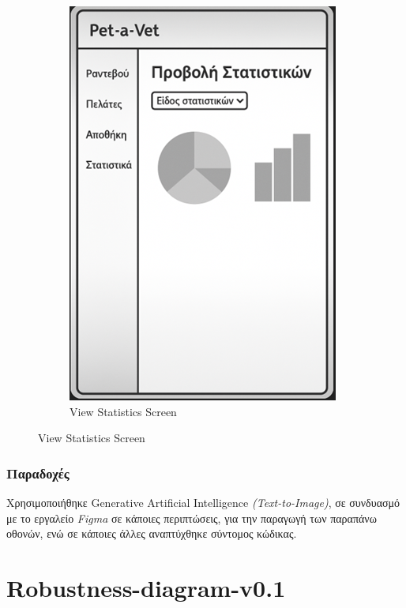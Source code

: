 \documentclass[12pt,a4paper,twoside]{book}
\begin{document}
\begin{figure}[H]
\begin{subfigure}[b]{0.48\textwidth}
        \includegraphics[width=\textwidth]{Mockup Screens/View_statistics.png}
        \caption{View Statistics Screen}\label{fig:mockup12}
    \end{subfigure}
\end{figure}

\subsection{Παραδοχές} %

Χρησιμοποιήθηκε Generative Artificial Intelligence \textit{(Text-to-Image)}, σε συνδυασμό με το εργαλείο \textit{Figma} σε κάποιες περιπτώσεις, για την παραγωγή των παραπάνω οθονών, ενώ σε κάποιες άλλες αναπτύχθηκε σύντομος κώδικας. %

\chapter{Robustness-diagram-v0.1}
\end{document}
